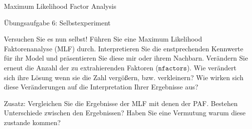 \documentclass[
  ignorenonframetext,
]{beamer}
\newenvironment{Shaded}{\begin{snugshade}}{\end{snugshade}}
\newcommand{\AttributeTok}[1]{\textcolor[rgb]{0.77,0.63,0.00}{#1}}
\newcommand{\CommentTok}[1]{\textcolor[rgb]{0.56,0.35,0.01}{\textit{#1}}}
\newcommand{\DecValTok}[1]{\textcolor[rgb]{0.00,0.00,0.81}{#1}}
\newcommand{\FunctionTok}[1]{\textcolor[rgb]{0.00,0.00,0.00}{#1}}
\newcommand{\NormalTok}[1]{#1}
\newcommand{\OtherTok}[1]{\textcolor[rgb]{0.56,0.35,0.01}{#1}}
\newcommand{\SpecialCharTok}[1]{\textcolor[rgb]{0.00,0.00,0.00}{#1}}
\newcommand{\StringTok}[1]{\textcolor[rgb]{0.31,0.60,0.02}{#1}}
\begin{document}
\begin{frame}[fragile]{Maximum Likelihood Factor Analysis}
\protect\hypertarget{maximum-likelihood-factor-analysis}{}
\begin{Shaded}
\end{Shaded}
\end{frame}

\begin{frame}{Übungsaufgabe 6: Selbstexperiment}
\protect\hypertarget{uxfcbungsaufgabe-6-selbstexperiment}{}
\begin{example}
Versuchen Sie es nun selbst! Führen Sie eine Maximum Likelihood Faktorenanalyse
(MLF) durch. Interpretieren Sie die enstprechenden Kennwerte für ihr Model und
präsentieren Sie diese mir oder ihrem Nachbarn. Verändern Sie erneut die Anzahl
der zu extrahierenden Faktoren ($\texttt{nfactors}$). Wie verändert sich ihre
Lösung wenn sie die Zahl vergößern, bzw. verkleinern? Wie wirken sich diese
Veränderungen auf die Interpretation Ihrer Ergebnisse aus?
\end{example}

Zusatz: Vergleichen Sie die Ergebnisse der MLF mit denen der PAF.
Bestehen Unterschiede zwischen den Ergebnissen? Haben Sie eine Vermutung
warum diese zustande kommen?
\end{frame}
\end{document}
